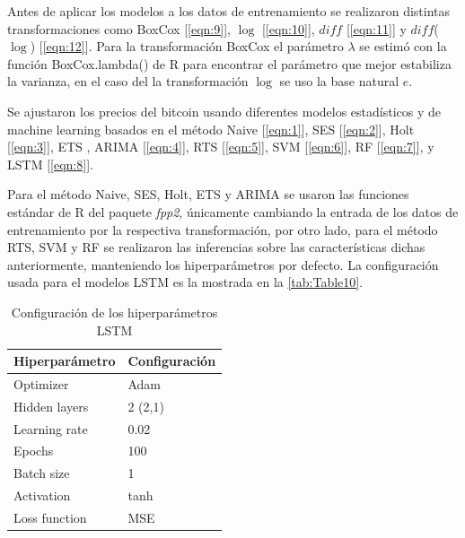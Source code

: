 Antes de aplicar los modelos a los datos de entrenamiento se realizaron distintas transformaciones como BoxCox [\ref{eqn:9}], $\log$ [\ref{eqn:10}], $diff$ [\ref{eqn:11}] y $diff$($\log$) [\ref{eqn:12}]. Para la transformación BoxCox el parámetro $\lambda$ se estimó con la función BoxCox.lambda() de R para encontrar el parámetro que mejor estabiliza la varianza, en el caso del la transformación $\log$ se uso la base natural $e$.

Se ajustaron los precios del bitcoin usando diferentes modelos estadísticos y de machine learning basados en el método Naive [\ref{eqn:1}], SES [\ref{eqn:2}], Holt [\ref{eqn:3}], ETS \footnotemark , ARIMA [\ref{eqn:4}], RTS [\ref{eqn:5}], SVM [\ref{eqn:6}], RF [\ref{eqn:7}], y LSTM [\ref{eqn:8}].

Para el método Naive, SES, Holt, ETS y ARIMA se usaron las funciones estándar de R del paquete \emph{fpp2}, únicamente cambiando la entrada de los datos de entrenamiento por la respectiva transformación, por otro lado, para el método RTS, SVM y RF se realizaron las inferencias sobre las características dichas anteriormente, manteniendo los hiperparámetros por defecto. La configuración usada para el modelos LSTM es la mostrada en la \autoref{tab:Table10}.

\begin{table}[!h]
	\centering
	\begin{tabular}{p{4cm} p{4cm}  }
		\toprule
		\textbf{Hiperparámetro} & \textbf{Configuración}\\
		\midrule
		Optimizer & Adam\\
		Hidden layers & 2 (2,1)\\
		Learning rate & 0.02\\
		Epochs & 100\\
		Batch size & 1\\
		Activation & tanh\\
		Loss function & MSE\\
		\bottomrule
		\hline
	\end{tabular}
	\caption{Configuración de los hiperparámetros LSTM}
	\label{tab:Table10}
\end{table}

